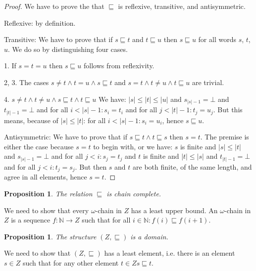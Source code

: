 \documentclass[a4paper]{article}
\newcommand{\arr}{\rightarrow}
\newtheorem{thmPONuFisChainComplete}[defNuF]{Proposition}
\newtheorem{thmPONuFisADomain}[defNuF]{Proposition}
\begin{document}
\begin{proof}

We have to prove the that $\sqsubseteq$ is reflexive, transitive, and
antisymmetric.

Reflexive: by definition.

Transitive: We have to prove that if $s \sqsubseteq t$ and $t \sqsubseteq u$
then $s \sqsubseteq u$ for all words $s$, $t$, $u$. We do so by distinguishing
four cases.

1. If $s = t = u$ then $s \sqsubseteq u$ follows from reflexivity.

2, 3. The cases $s \neq t \wedge t = u \wedge s \sqsubseteq t$ and $s = t
\wedge t \neq u \wedge t \sqsubseteq u$ are trivial.

4. $s \neq t \wedge t \neq u \wedge s \sqsubseteq t \wedge t \sqsubseteq u$ We
have: $|s| \leq |t| \leq |u|$ and $s_{|s|-1} = \bot$ and $t_{|t|-1} = \bot$ and
for all $i < |s|-1: s_i = t_i$ and for all $j < |t|-1: t_j = u_j$.  But this
means, because of $|s| \leq |t|$: for all $i < |s|-1: s_i = u_i$, hence $s
\sqsubseteq u$.

Antisymmetric: We have to prove that if $s \sqsubseteq t \wedge t \sqsubseteq
s$ then $s = t$.  The premise is either the case because $s = t$ to begin with,
or we have: $s$ is finite and $|s| \leq |t|$ and $s_{|s|-1} = \bot$ and for all $j <
i: s_j = t_j$ and $t$ is finite and $|t| \leq |s|$ and $t_{|t|-1} = \bot$ and for all
$j < i: t_j = s_j$.  But then $s$ and $t$ are both finite, of the same length,
and agree in all elements, hence $s = t$.

\end{proof}

\begin{thmPONuFisChainComplete}

The relation $\sqsubseteq$ is chain complete.

\end{thmPONuFisChainComplete}

We need to show that every $\omega$-chain in $Z$ has a least upper bound.
An $\omega$-chain in $Z$ is a sequence $f : \mathbb{N} \arr Z$ such
that for all $i \in \mathbb{N}: f(i) \sqsubseteq f(i + 1)$.


\begin{thmPONuFisADomain}

The structure $(Z, \sqsubseteq)$ is a domain.

\end{thmPONuFisADomain}

We need to show that $(Z, \sqsubseteq)$ has a least element, i.e. there is
an element $s \in Z$ such that for any other element $t \in Z s
\sqsubseteq t$.
\end{document}
